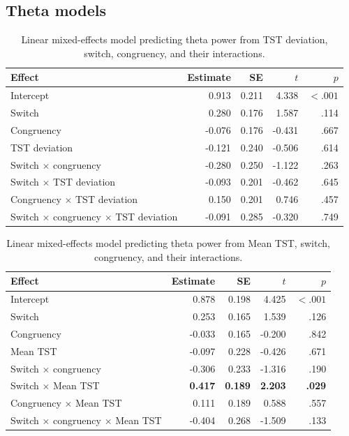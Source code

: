 \documentclass[12pt,a4paper]{report}
\begin{document}
\begin{appendices}
\subsection{Theta models}
\label{app:mixed_models_theta}

\begin{table}[H]
\centering
\small
\caption{Linear mixed-effects model predicting theta power from TST deviation, switch, congruency, and their interactions.}
\label{tab:app_theta_tstdev}
\begin{tabularx}{\textwidth}{Xrrrr}
\toprule
Effect & Estimate & SE & $t$ & $p$ \\
\midrule
Intercept & 0.913 & 0.211 & 4.338 & $< .001$ \\
Switch & 0.280 & 0.176 & 1.587 & .114 \\
Congruency & -0.076 & 0.176 & -0.431 & .667 \\
TST deviation & -0.121 & 0.240 & -0.506 & .614 \\
Switch $\times$ congruency & -0.280 & 0.250 & -1.122 & .263 \\
Switch $\times$ TST deviation & -0.093 & 0.201 & -0.462 & .645 \\
Congruency $\times$ TST deviation & 0.150 & 0.201 & 0.746 & .457 \\
Switch $\times$ congruency $\times$ TST deviation & -0.091 & 0.285 & -0.320 & .749 \\
\bottomrule
\end{tabularx}
\end{table}

\begin{table}[H]
\centering
\small
\caption{Linear mixed-effects model predicting theta power from Mean TST, switch, congruency, and their interactions.}
\label{tab:app_theta_meantst}
\begin{tabularx}{\textwidth}{Xrrrr}
\toprule
Effect & Estimate & SE & $t$ & $p$ \\
\midrule
Intercept & 0.878 & 0.198 & 4.425 & $< .001$ \\
Switch & 0.253 & 0.165 & 1.539 & .126 \\
Congruency & -0.033 & 0.165 & -0.200 & .842 \\
Mean TST & -0.097 & 0.228 & -0.426 & .671 \\
Switch $\times$ congruency & -0.306 & 0.233 & -1.316 & .190 \\
Switch $\times$ Mean TST & \textbf{0.417} & \textbf{0.189} & \textbf{2.203} & \textbf{.029} \\
Congruency $\times$ Mean TST & 0.111 & 0.189 & 0.588 & .557 \\
Switch $\times$ congruency $\times$ Mean TST & -0.404 & 0.268 & -1.509 & .133 \\
\bottomrule
\end{tabularx}
\end{table}


\end{appendices}
\end{document}
